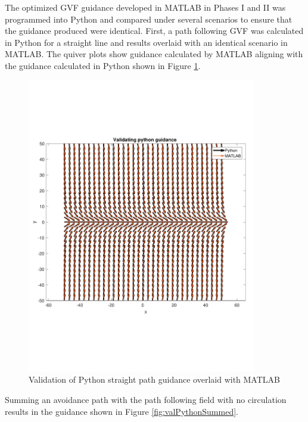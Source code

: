 \documentclass[numbered,pdftex]{ohio-etd}
\begin{document}
The optimized GVF guidance developed in MATLAB in Phases I and II was programmed into Python and compared under several scenarios to ensure that the guidance produced were identical. First, a path following GVF was calculated in Python for a straight line and results overlaid with an identical scenario in MATLAB. The quiver plots show guidance calculated by MATLAB aligning with the guidance calculated in Python shown in Figure \ref{fig:valPythonStraightPath}.

\begin{figure}[H]
	\centering
	\includegraphics[trim=0 150 0 150,clip,width=10cm]{PaperFigures/Methods/resultsPython/PathConfirm}
	\caption{Validation of Python straight path guidance overlaid with MATLAB}
	\label{fig:valPythonStraightPath}
\end{figure}



Summing an avoidance path with the path following field with no circulation results in the guidance shown in Figure \ref{fig:valPythonSummed}.
\end{document}
